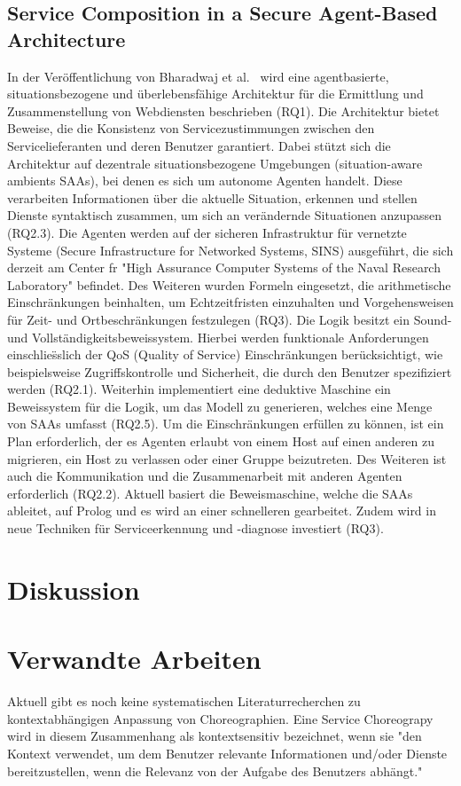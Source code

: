 \documentclass[conference,compsoc]{IEEEtran}
\begin{document}
\subsection{Service Composition in a Secure Agent-Based Architecture}
In der Veröffentlichung von Bharadwaj et al.~\cite{bharadwaj2005service} wird eine agentbasierte, situationsbezogene und überlebensfähige Architektur für die Ermittlung und Zusammenstellung von Webdiensten beschrieben (RQ1). Die Architektur bietet Beweise, die die Konsistenz von Servicezustimmungen zwischen den Servicelieferanten und deren Benutzer garantiert. Dabei stützt sich die Architektur auf dezentrale situationsbezogene Umgebungen (situation-aware ambients SAAs), bei denen es sich um autonome Agenten handelt. Diese verarbeiten Informationen über die aktuelle Situation, erkennen und stellen Dienste syntaktisch zusammen, um sich an verändernde Situationen anzupassen (RQ2.3). Die Agenten werden auf der sicheren Infrastruktur für vernetzte Systeme (Secure Infrastructure for Networked Systems, SINS) ausgeführt, die sich derzeit am Center f{}r "High Assurance Computer Systems of the Naval Research Laboratory" befindet. Des Weiteren wurden Formeln eingesetzt, die arithmetische Einschränkungen beinhalten, um Echtzeitfristen einzuhalten und Vorgehensweisen für Zeit- und Ortbeschränkungen festzulegen (RQ3). Die Logik besitzt ein Sound- und Vollständigkeitsbeweissystem. Hierbei werden funktionale Anforderungen einschlie{\"ss}lich der QoS (Quality of Service) Einschränkungen berücksichtigt, wie beispielsweise Zugriffskontrolle und Sicherheit, die durch den Benutzer spezifiziert werden (RQ2.1). Weiterhin implementiert eine deduktive Maschine ein Beweissystem für die Logik, um das Modell zu generieren, welches eine Menge von SAAs umfasst (RQ2.5). Um die Einschränkungen erfüllen zu können, ist ein Plan erforderlich, der es Agenten erlaubt von einem Host auf einen anderen zu migrieren, ein Host zu verlassen oder einer Gruppe beizutreten. Des Weiteren ist auch die Kommunikation und die Zusammenarbeit mit anderen Agenten erforderlich (RQ2.2). Aktuell basiert die Beweismaschine, welche die SAAs ableitet, auf Prolog und es wird an einer schnelleren gearbeitet. Zudem wird in neue Techniken für Serviceerkennung und -diagnose investiert (RQ3).
\section{Diskussion}

\section{Verwandte Arbeiten}
Aktuell gibt es noch keine systematischen Literaturrecherchen zu kontextabhängigen Anpassung von Choreographien.
Eine Service Choreograpy wird in diesem Zusammenhang als kontextsensitiv bezeichnet, wenn sie "den Kontext verwendet, um dem Benutzer relevante Informationen und/oder Dienste bereitzustellen, wenn die Relevanz von der Aufgabe des Benutzers abhängt."~\cite[S.~2]{dey2001understanding}
\end{document}
